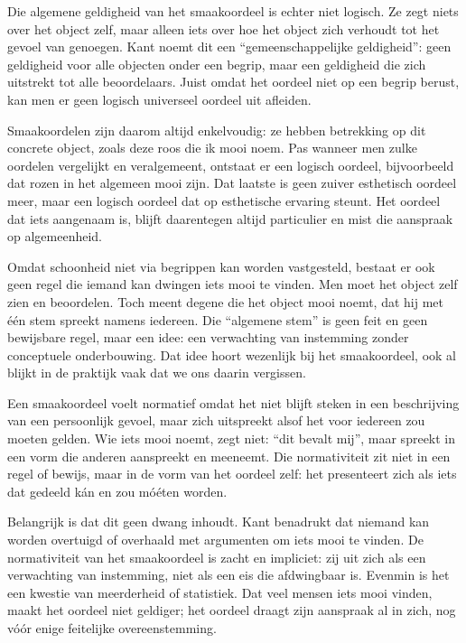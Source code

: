 \begin{mdframed}[leftmargin=0pt,rightmargin=0pt,backgroundcolor=blue!6,linecolor=white,innertopmargin=6pt,innerbottommargin=6pt]
Die algemene geldigheid van het smaakoordeel is echter niet logisch. Ze zegt niets over het object zelf, maar alleen iets over hoe het object zich verhoudt tot het gevoel van genoegen. Kant noemt dit een “gemeenschappelijke geldigheid”: geen geldigheid voor alle objecten onder een begrip, maar een geldigheid die zich uitstrekt tot alle beoordelaars. Juist omdat het oordeel niet op een begrip berust, kan men er geen logisch universeel oordeel uit afleiden.

Smaakoordelen zijn daarom altijd enkelvoudig: ze hebben betrekking op dit concrete object, zoals deze roos die ik mooi noem. Pas wanneer men zulke oordelen vergelijkt en veralgemeent, ontstaat er een logisch oordeel, bijvoorbeeld dat rozen in het algemeen mooi zijn. Dat laatste is geen zuiver esthetisch oordeel meer, maar een logisch oordeel dat op esthetische ervaring steunt. Het oordeel dat iets aangenaam is, blijft daarentegen altijd particulier en mist die aanspraak op algemeenheid.

Omdat schoonheid niet via begrippen kan worden vastgesteld, bestaat er ook geen regel die iemand kan dwingen iets mooi te vinden. Men moet het object zelf zien en beoordelen. Toch meent degene die het object mooi noemt, dat hij met één stem spreekt namens iedereen. Die “algemene stem” is geen feit en geen bewijsbare regel, maar een idee: een verwachting van instemming zonder conceptuele onderbouwing. Dat idee hoort wezenlijk bij het smaakoordeel, ook al blijkt in de praktijk vaak dat we ons daarin vergissen.

\bigskip

Een smaakoordeel voelt normatief omdat het niet blijft steken in een beschrijving van een persoonlijk gevoel, maar zich uitspreekt alsof het voor iedereen zou moeten gelden. Wie iets mooi noemt, zegt niet: “dit bevalt mij”, maar spreekt in een vorm die anderen aanspreekt en meeneemt. Die normativiteit zit niet in een regel of bewijs, maar in de vorm van het oordeel zelf: het presenteert zich als iets dat gedeeld kán en zou móéten worden.

Belangrijk is dat dit geen dwang inhoudt. Kant benadrukt dat niemand kan worden overtuigd of overhaald met argumenten om iets mooi te vinden. De normativiteit van het smaakoordeel is zacht en impliciet: zij uit zich als een verwachting van instemming, niet als een eis die afdwingbaar is. Evenmin is het een kwestie van meerderheid of statistiek. Dat veel mensen iets mooi vinden, maakt het oordeel niet geldiger; het oordeel draagt zijn aanspraak al in zich, nog vóór enige feitelijke overeenstemming.


\end{mdframed}
